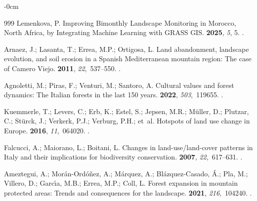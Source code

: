 \documentclass[jimaging,article,accept,pdftex,oneauthor]{Definitions/mdpi}
\begin{document}
\begin{adjustwidth}{-\extralength}{0cm}
\begin{thebibliography}{999}
Lemenkova, P.
\newblock Improving Bimonthly Landscape Monitoring in Morocco, North Africa, by
  Integrating Machine Learning with GRASS GIS.
 {\bf 2025}, {\em 5}, {5.}
.

Arnaez, J.; Lasanta, T.; Errea, M.P.; Ortigosa, L.
\newblock Land abandonment, landscape evolution, and soil erosion in a Spanish
  Mediterranean mountain region: The case of Camero Viejo.
 {\bf 2011}, {\em 22},~537--550.
.

Agnoletti, M.; Piras, F.; Venturi, M.; Santoro, A.
\newblock Cultural values and forest dynamics: The Italian forests in the last
  150 years.
 {\bf 2022}, {\em 503},~119655.
.

Kuemmerle, T.; Levers, C.; Erb, K.; Estel, S.; Jepsen, M.R.; M{\"u}ller, D.;
  Plutzar, C.; St{\"u}rck, J.; Verkerk, P.J.; Verburg, P.H.;  et~al.
\newblock Hotspots of land use change in Europe.
 {\bf 2016}, {\em 11},~064020.
.

Falcucci, A.; Maiorano, L.; Boitani, L.
\newblock Changes in land-use/land-cover patterns in Italy and their
  implications for biodiversity conservation.
 {\bf 2007}, {\em 22},~617--631.
.

Ameztegui, A.; Mor{\'a}n-Ord{\'o}{\~n}ez, A.; M{\'a}rquez, A.;
  Bl{\'a}zquez-Casado, {\'A}.; Pla, M.; Villero, D.; Garc{\'\i}a, M.B.; Errea,
  M.P.; Coll, L.
\newblock Forest expansion in mountain protected areas: Trends and consequences
  for the landscape.
 {\bf 2021}, {\em 216},~104240.
.


\end{thebibliography}
\end{adjustwidth}
\end{document}
